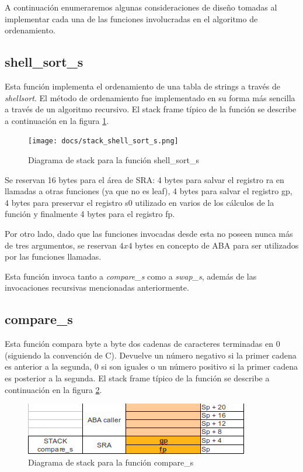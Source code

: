 \documentclass[a4paper,11pt]{article}
\begin{document}
A continuación enumeraremos algunas consideraciones de diseño tomadas al
implementar cada una de las funciones involucradas en el algoritmo de
ordenamiento.

\subsection{shell\_sort\_s}

Esta función implementa el ordenamiento de una tabla de strings a través de
\textit{shellsort}. El método de ordenamiento fue implementado en su forma más
sencilla a través de un algoritmo recursivo. El stack frame típico de la
función se describe a continuación en la figura \ref{fig:stackshell}.

\begin{figure}[h!]
  \centering
  \texttt{[image: docs/stack\_shell\_sort\_s.png]}
  \caption{Diagrama de stack para la función shell\_sort\_s} \label{fig:stackshell}
\end{figure}

\FloatBarrier

Se reservan 16 bytes para el área de SRA: 4 bytes para salvar el registro ra en
llamadas a otras funciones (ya que no es leaf), 4 bytes para salvar el registro gp, 4 bytes para
preservar el registro s0 utilizado en varios de los cálculos de la función y
finalmente 4 bytes para el registro fp.

Por otro lado, dado que las funciones invocadas desde esta no poseen nunca más
de tres argumentos, se reservan \(4 x 4\) bytes en concepto de ABA para ser
utilizados por las funciones llamadas.

Esta función invoca tanto a \textit{compare\_s} como a \textit{swap\_s}, además
de las invocaciones recursivas mencionadas anteriormente.

\subsection{compare\_s}

Esta función compara byte a byte dos cadenas de caracteres terminadas en 0
(siguiendo la convención de C). Devuelve un número negativo si la primer cadena
es anterior a la segunda, 0 si son iguales o un número positivo si la primer
cadena es posterior a la segunda. El stack frame típico de la función se
describe a continuación en la figura \ref{fig:stackcompare}.

\begin{figure}[h!]
  \centering
  \includegraphics[width=\textwidth]{docs/stack_compare_s.png}
  \caption{Diagrama de stack para la función compare\_s} \label{fig:stackcompare}
\end{figure}
\end{document}
